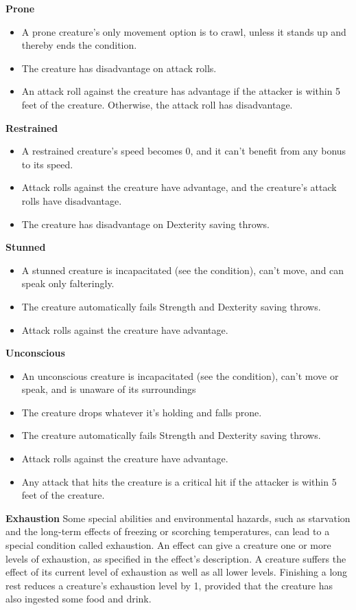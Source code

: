 \documentclass[a4paper,10pt,twoside,twocolumn]{dndbook} %
\begin{document}
	\begin{DndSidebar}{}
	\textbf{Prone}
	\begin{itemize}
		\item A prone creature's only movement option is to crawl, unless it stands up and thereby ends the condition.
		\item The creature has disadvantage on attack rolls.
		\item An attack roll against the creature has advantage if the attacker is within 5 feet of the creature. Otherwise, the attack roll has disadvantage.
	\end{itemize}
	\textbf{Restrained}
	\begin{itemize}
		\item A restrained creature's speed becomes 0, and it can't benefit from any bonus to its speed.
		\item Attack rolls against the creature have advantage, and the creature's attack rolls have disadvantage.
		\item The creature has disadvantage on Dexterity saving throws.
	\end{itemize}
	\textbf{Stunned}
	\begin{itemize}
		\item A stunned creature is incapacitated (see the condition), can't move, and can speak only falteringly.
		\item The creature automatically fails Strength and Dexterity saving throws.
		\item Attack rolls against the creature have advantage.
	\end{itemize}
	\textbf{Unconscious}
	\begin{itemize}
		\item An unconscious creature is incapacitated (see the condition), can't move or speak, and is unaware of its surroundings
		\item The creature drops whatever it's holding and falls prone.
		\item The creature automatically fails Strength and Dexterity saving throws.
		\item Attack rolls against the creature have advantage.
		\item Any attack that hits the creature is a critical hit if the attacker is within 5 feet of the creature.
	\end{itemize}
	\textbf{Exhaustion}\linebreak
	Some special abilities and environmental hazards, such as starvation and the long-term effects of freezing or scorching temperatures, can lead to a special condition called exhaustion. An effect can give a creature one or more levels of exhaustion, as specified in the effect's description. A creature suffers the effect of its current level of exhaustion as well as all lower levels. Finishing a long rest reduces a creature's exhaustion level by 1, provided that the creature has also ingested some food and drink. 
	\end{DndSidebar}
\end{document}
